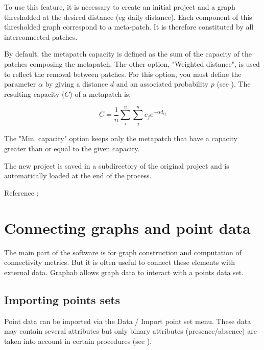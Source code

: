 \documentclass{article}
\begin{document}
To use this feature, it is necessary to create an initial project and a graph thresholded at the desired distance (eg daily distance). Each component of this thresholded graph correspond to a meta-patch. It is therefore constituted by all interconnected patches.

By default, the metapatch capacity is defined as the sum of the capacity of the patches composing the metapatch. The other option, "Weighted distance", is used to reflect the removal between patches. For this option, you must define the parameter $\alpha$ by giving a distance $d$ and an associated probability $p$ (see ). The resulting capacity ($C$) of a metapatch is:

$$C = \frac{1}{n}\sum_{i}^n\sum_{j}^n c_j e^{-\alpha d_{ij}}$$ 

The "Min. capacity" option keeps only the metapatch that have a capacity greater than or equal to the given capacity.

The new project is saved in a subdirectory of the original project and is automatically loaded at the end of the process.

Reference : \cite{2015_monkey}


\section{Connecting graphs and point data}

The main part of the software is for graph construction and computation of connectivity metrics. But it is often useful to connect these elements with external data. Graphab allows graph data to interact with a points data set.

\subsection{Importing points sets}

Point data can be imported via the Data / Import point set menu. These data may contain several attributes but only binary attributes (presence/absence) are taken into account in certain procedures (see ).
\end{document}
